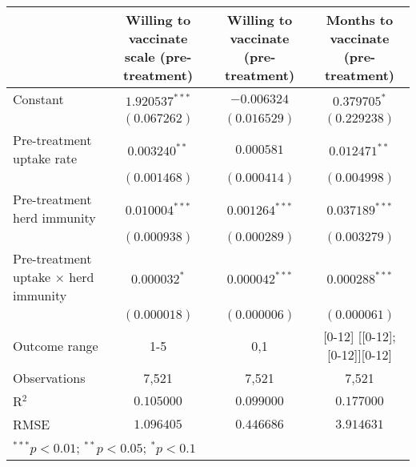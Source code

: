 \begin{table}
\begin{center}
\begin{tabular}{l c c c}
\hline
 & Willing to vaccinate scale (pre-treatment) & Willing to vaccinate (pre-treatment) & Months to vaccinate (pre-treatment) \\
\hline
Constant                                    & $1.920537^{***}$ & $-0.006324$      & $0.379705^{*}$                \\
                                            & $(0.067262)$     & $(0.016529)$     & $(0.229238)$                  \\
Pre-treatment uptake rate                   & $0.003240^{**}$  & $0.000581$       & $0.012471^{**}$               \\
                                            & $(0.001468)$     & $(0.000414)$     & $(0.004998)$                  \\
Pre-treatment herd immunity                 & $0.010004^{***}$ & $0.001264^{***}$ & $0.037189^{***}$              \\
                                            & $(0.000938)$     & $(0.000289)$     & $(0.003279)$                  \\
Pre-treatment uptake $\times$ herd immunity & $0.000032^{*}$   & $0.000042^{***}$ & $0.000288^{***}$              \\
                                            & $(0.000018)$     & $(0.000006)$     & $(0.000061)$                  \\
\hline
Outcome range                               & {1-5}            & {0,1}            & [0-12] [[0-12]; [0-12]][0-12] \\
Observations                                & 7,521            & 7,521            & 7,521                         \\
R$^{2}$                                     & $0.105000$       & $0.099000$       & $0.177000$                    \\
RMSE                                        & $1.096405$       & $0.446686$       & $3.914631$                    \\
\hline
\multicolumn{4}{l}{\scriptsize{$^{***}p<0.01$; $^{**}p<0.05$; $^{*}p<0.1$}}
\end{tabular}
\caption{}
\label{table:SI_table18_pretreat_outcomes_on_rates}
\end{center}
\end{table}
